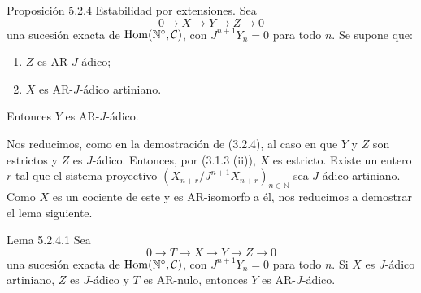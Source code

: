 \begin{statement}{Proposición 5.2.4}
Estabilidad por extensiones. Sea
\[
0\longrightarrow X\longrightarrow Y\longrightarrow Z\longrightarrow0
\]
una sucesión exacta de \(\operatorname{Hom}(\mathbb N^\circ,\mathcal C)\), con \(J^{n+1}Y_n=0\) para todo \(n\). Se supone que:
\begin{enumerate}[label=\textup{(\roman*)}]
\item \(Z\) es AR-\(J\)-ádico;
\item \(X\) es AR-\(J\)-ádico artiniano.
\end{enumerate}
Entonces \(Y\) es AR-\(J\)-ádico.
\end{statement}

\begin{prooftext}
Nos reducimos, como en la demostración de (3.2.4), al caso en que \(Y\) y \(Z\) son estrictos y \(Z\) es \(J\)-ádico. Entonces, por (3.1.3 (ii)), \(X\) es estricto. Existe un entero \(r\) tal que el sistema proyectivo \((X_{n+r}/J^{n+1}X_{n+r})_{n\in\mathbb N}\) sea \(J\)-ádico artiniano. Como \(X\) es un cociente de este y es AR-isomorfo a él, nos reducimos a demostrar el lema siguiente.
\end{prooftext}

\begin{statement}{Lema 5.2.4.1}
Sea
\[
0\longrightarrow T\longrightarrow X\longrightarrow Y\longrightarrow Z\longrightarrow0
\]
una sucesión exacta de \(\operatorname{Hom}(\mathbb N^\circ,\mathcal C)\), con \(J^{n+1}Y_n=0\) para todo \(n\). Si \(X\) es \(J\)-ádico artiniano, \(Z\) es \(J\)-ádico y \(T\) es AR-nulo, entonces \(Y\) es AR-\(J\)-ádico.
\end{statement}
